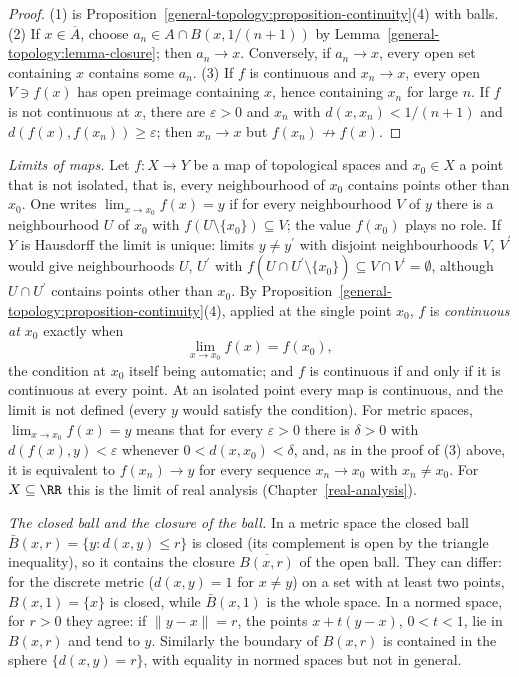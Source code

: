 \begin{proof}
(1) is Proposition~\ref{general-topology:proposition-continuity}(4) with balls. (2) If $x \in \overline{A}$, choose $a_n \in A \cap B(x, 1/(n+1))$ by
Lemma~\ref{general-topology:lemma-closure}; then $a_n \to x$. Conversely, if $a_n \to x$, every open set containing $x$ contains some $a_n$.
(3) If $f$ is continuous and $x_n \to x$, every open $V \ni f(x)$ has open preimage containing $x$, hence containing $x_n$ for large $n$.
If $f$ is not continuous at $x$, there are $\varepsilon > 0$ and $x_n$ with $d(x, x_n) < 1/(n+1)$ and $d(f(x), f(x_n)) \geq \varepsilon$; then
$x_n \to x$ but $f(x_n) \not\to f(x)$.
\end{proof}

\begin{remark}\label{general-topology:remark-limits-continuity}
\emph{Limits of maps.} Let $f \colon X \to Y$ be a map of topological spaces and $x_0 \in X$ a point that is not isolated, that is, every neighbourhood of $x_0$ contains points other than
$x_0$. One writes $\lim_{x \to x_0}f(x) = y$ if for every neighbourhood $V$ of $y$ there is a neighbourhood $U$ of $x_0$ with $f(U \setminus \{x_0\}) \subseteq V$; the value $f(x_0)$ plays no
role. If $Y$ is Hausdorff the limit is unique: limits $y \neq y^{\prime}$ with disjoint neighbourhoods $V$, $V^{\prime}$ would give neighbourhoods $U$, $U^{\prime}$ with $f(U \cap U^{\prime} \setminus
\{x_0\}) \subseteq V \cap V^{\prime} = \emptyset$, although $U \cap U^{\prime}$ contains points other than $x_0$. By Proposition~\ref{general-topology:proposition-continuity}(4), applied at the single
point $x_0$, $f$ is \emph{continuous at $x_0$} exactly when
\[
\lim_{x \to x_0}f(x) = f(x_0),
\]
the condition at $x_0$ itself being automatic; and $f$ is continuous if and only if it is continuous at every point. At an isolated point every map is continuous, and the limit is not
defined (every $y$ would satisfy the condition). For metric spaces, $\lim_{x \to x_0}f(x) = y$ means that for every $\varepsilon > 0$ there is $\delta > 0$ with $d(f(x), y) < \varepsilon$ whenever
$0 < d(x, x_0) < \delta$, and, as in the proof of (3) above, it is equivalent to $f(x_n) \to y$ for every sequence $x_n \to x_0$ with $x_n \neq x_0$. For $X \subseteq \RR$ this is the limit of
real analysis (Chapter~\ref{real-analysis}).
\end{remark}

\begin{example}\label{general-topology:example-closed-ball}
\emph{The closed ball and the closure of the ball.} In a metric space the closed ball $\bar B(x, r) = \{y : d(x, y) \leq r\}$ is closed (its complement is open by the triangle inequality), so it
contains the closure $\overline{B(x, r)}$ of the open ball. They can differ: for the discrete metric ($d(x, y) = 1$ for $x \neq y$) on a set with at least two points, $B(x, 1) = \{x\}$ is closed, while
$\bar B(x, 1)$ is the whole space. In a normed space, for $r > 0$ they agree: if $\|y - x\| = r$, the points $x + t(y - x)$, $0 < t < 1$, lie in $B(x, r)$ and tend to $y$. Similarly the boundary of
$B(x, r)$ is contained in the sphere $\{d(x, y) = r\}$, with equality in normed spaces but not in general.
\end{example}

